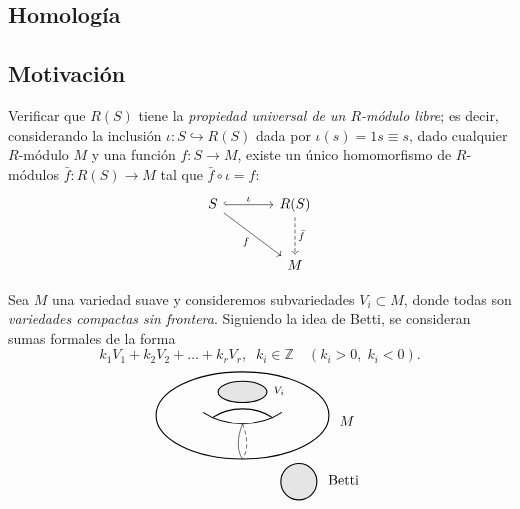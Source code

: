 \begin{center}
    \section{Homología}
\end{center}
\subsection{Motivación}
\begin{ejercicio}
Verificar que $R(S)$ tiene la \textit{propiedad universal de un $R$-módulo libre}; es decir, considerando la inclusión $\iota \colon S \hookrightarrow R(S)$ dada por $\iota(s) = 1s \equiv s$, dado cualquier $R$-módulo $M$ y una función $f \colon S \to M$, existe un único homomorfismo de $R$-módulos $\bar{f} \colon R(S) \to M$ tal que $\bar{f} \circ \iota = f$:
\[
\begin{tikzcd}[row sep=large, column sep=large]
S \arrow[r, "\iota", hook] \arrow[dr, "f"'] & R(S) \arrow[d, "\bar{f}", dashed] \\
& M
\end{tikzcd}
\]
\end{ejercicio}
Sea $M$ una variedad suave y consideremos subvariedades $V_i \subset M$, donde todas son \textit{variedades compactas sin frontera}. Siguiendo la idea de Betti, se consideran sumas formales de la forma
\[
k_1 V_1 + k_2 V_2 + \dots + k_r V_r, \;\; k_i \in \mathbb{Z} \quad (k_i > 0, \; k_i < 0).
\]
\[
\begin{tikzpicture}[scale=0.95]
    \draw[thick] (0,0) ellipse (2.3 and 1.15);
    \draw[thick] (-1.05, 0.08) .. controls (-0.45, -0.32) and (0.45, -0.32) .. (1.05, 0.08);
    \draw[thick] (-0.8, -0.06) .. controls (-0.35, 0.25) and (0.35, 0.25) .. (0.8, -0.06);

    \fill[gray!20] (0, 0.62) ellipse (0.65 and 0.28);
    \draw[thick] (0, 0.62) ellipse (0.65 and 0.28);
    \node[right] at (0.7, 0.65) {$\scriptstyle V_i$};

    \draw[thin] (0, -0.22) .. controls (-0.15, -0.6) and (-0.15, -0.95) .. (0, -1.15);
    \draw[thin, densely dashed] (0, -0.22) .. controls (0.15, -0.6) and (0.15, -0.95) .. (0, -1.15);

    \node[right] at (2.45, -0.15) {$M$};

    \begin{scope}[shift={(1.5, -1.75)}]
        \fill[gray!20] (0,0) circle (0.48);
        \draw[thick] (0,0) circle (0.48);
        \node[right] at (0.65, 0.05) {Betti};
    \end{scope}
\end{tikzpicture}
\]

